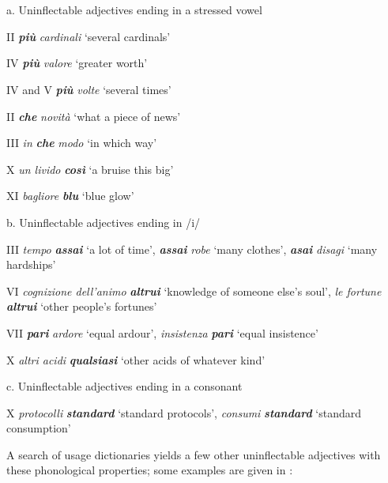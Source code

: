 \documentclass[output=paper]{langscibook}
\begin{document}
\ea%
    \label{ex:key:15}
    \gll \\
         \\
    \glt
    \z %

          a.   Uninflectable adjectives ending in a stressed vowel

II \textbf{\textit{più}} \textit{cardinali} ‘several cardinals’ 

IV \textbf{\textit{più}} \textit{valore} ‘greater worth’

IV and V \textbf{\textit{più}} \textit{volte} ‘several times’

II \textbf{\textit{che}} \textit{novità} ‘what a piece of news’ 

III \textit{in} \textbf{\textit{che}} \textit{modo} ‘in which way’

X \textit{un livido} \textbf{\textit{così}} ‘a bruise this big’

XI \textit{bagliore} \textbf{\textit{blu}} ‘blue glow’

  b.   Uninflectable adjectives ending in /i/

III \textit{tempo} \textbf{\textit{assai}} ‘a lot of time’, \textbf{\textit{assai}} \textit{robe} ‘many clothes’, \textbf{\textit{asai}} \textit{disagi} ‘many hardships’ 

VI \textit{cognizione dell’animo} \textbf{\textit{altrui}} ‘knowledge of someone else’s soul’, \textit{le fortune} \textbf{\textit{altrui}} ‘other people’s fortunes’ 

VII \textbf{\textit{pari}} \textit{ardore} ‘equal ardour’, \textit{insistenza} \textbf{\textit{pari}} ‘equal insistence’

X \textit{altri acidi} \textbf{\textit{qualsiasi}} ‘other acids of whatever kind’

  c.   Uninflectable adjectives ending in a consonant

X \textit{protocolli} \textbf{\textit{standard}} ‘standard protocols’, \textit{consumi} \textbf{\textit{standard}} ‘standard consumption’ 

A search of usage dictionaries yields a few other uninflectable adjectives with these phonological properties; some examples are given in :

\ea%
    \label{ex:key:16}
    \gll \\
         \\
    \glt
    \z %
\end{document}
